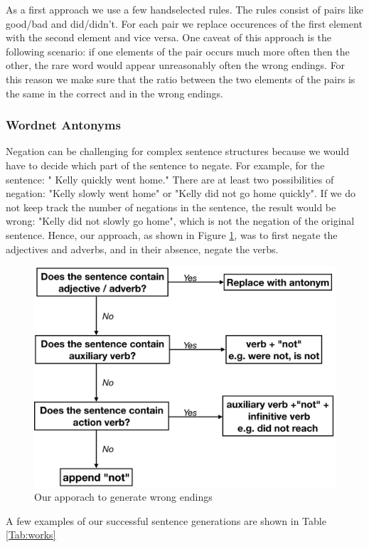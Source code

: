 \documentclass{article}
\begin{document}
As a first approach we use a few handselected rules. The rules consist of pairs like good/bad and did/didn't. For each pair we replace occurences of the first element with the second element and vice versa. One caveat of this approach is the following scenario: if one elements of the pair occurs much more often then the other, the rare word would appear unreasonably often the wrong endings. For this reason we make sure that the ratio between the two elements of the pairs is the same in the correct and in the wrong endings.


\subsubsection{Wordnet Antonyms}

Negation can be challenging for complex sentence structures because we would have to decide which part of the sentence to negate. For example, for the sentence: "
Kelly quickly went home." There are at least two possibilities of negation: "Kelly slowly went home" or "Kelly did not go home quickly". If we do not keep track the number of negations in the sentence, the result would be wrong: "Kelly did not slowly go home", which is not the negation of the original sentence. Hence, our approach, as shown in Figure \ref{Figure:wrong}, was to first negate the adjectives and adverbs, and in their absence, negate the verbs.

\begin{figure}
  \centering
  \includegraphics[width=0.7 \linewidth]{fig/wrong.png}
  \caption{Our apporach to generate wrong endings}
  \label{Figure:wrong}
\end{figure}


A few examples of our successful sentence generations are shown in Table \ref{Tab:works}
\end{document}
